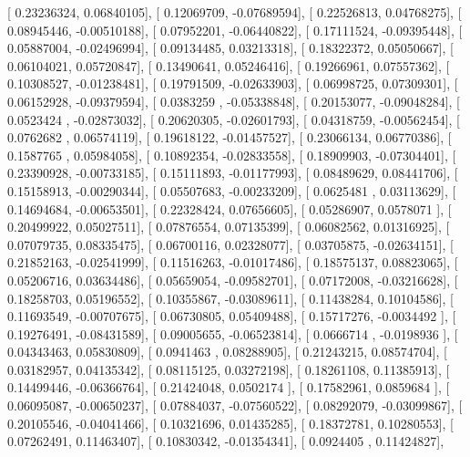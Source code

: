 \documentclass{article}
\begin{document}
       [ 0.23236324,  0.06840105],
       [ 0.12069709, -0.07689594],
       [ 0.22526813,  0.04768275],
       [ 0.08945446, -0.00510188],
       [ 0.07952201, -0.06440822],
       [ 0.17111524, -0.09395448],
       [ 0.05887004, -0.02496994],
       [ 0.09134485,  0.03213318],
       [ 0.18322372,  0.05050667],
       [ 0.06104021,  0.05720847],
       [ 0.13490641,  0.05246416],
       [ 0.19266961,  0.07557362],
       [ 0.10308527, -0.01238481],
       [ 0.19791509, -0.02633903],
       [ 0.06998725,  0.07309301],
       [ 0.06152928, -0.09379594],
       [ 0.0383259 , -0.05338848],
       [ 0.20153077, -0.09048284],
       [ 0.0523424 , -0.02873032],
       [ 0.20620305, -0.02601793],
       [ 0.04318759, -0.00562454],
       [ 0.0762682 ,  0.06574119],
       [ 0.19618122, -0.01457527],
       [ 0.23066134,  0.06770386],
       [ 0.1587765 ,  0.05984058],
       [ 0.10892354, -0.02833558],
       [ 0.18909903, -0.07304401],
       [ 0.23390928, -0.00733185],
       [ 0.15111893, -0.01177993],
       [ 0.08489629,  0.08441706],
       [ 0.15158913, -0.00290344],
       [ 0.05507683, -0.00233209],
       [ 0.0625481 ,  0.03113629],
       [ 0.14694684, -0.00653501],
       [ 0.22328424,  0.07656605],
       [ 0.05286907,  0.0578071 ],
       [ 0.20499922,  0.05027511],
       [ 0.07876554,  0.07135399],
       [ 0.06082562,  0.01316925],
       [ 0.07079735,  0.08335475],
       [ 0.06700116,  0.02328077],
       [ 0.03705875, -0.02634151],
       [ 0.21852163, -0.02541999],
       [ 0.11516263, -0.01017486],
       [ 0.18575137,  0.08823065],
       [ 0.05206716,  0.03634486],
       [ 0.05659054, -0.09582701],
       [ 0.07172008, -0.03216628],
       [ 0.18258703,  0.05196552],
       [ 0.10355867, -0.03089611],
       [ 0.11438284,  0.10104586],
       [ 0.11693549, -0.00707675],
       [ 0.06730805,  0.05409488],
       [ 0.15717276, -0.0034492 ],
       [ 0.19276491, -0.08431589],
       [ 0.09005655, -0.06523814],
       [ 0.0666714 , -0.0198936 ],
       [ 0.04343463,  0.05830809],
       [ 0.0941463 ,  0.08288905],
       [ 0.21243215,  0.08574704],
       [ 0.03182957,  0.04135342],
       [ 0.08115125,  0.03272198],
       [ 0.18261108,  0.11385913],
       [ 0.14499446, -0.06366764],
       [ 0.21424048,  0.0502174 ],
       [ 0.17582961,  0.0859684 ],
       [ 0.06095087, -0.00650237],
       [ 0.07884037, -0.07560522],
       [ 0.08292079, -0.03099867],
       [ 0.20105546, -0.04041466],
       [ 0.10321696,  0.01435285],
       [ 0.18372781,  0.10280553],
       [ 0.07262491,  0.11463407],
       [ 0.10830342, -0.01354341],
       [ 0.0924405 ,  0.11424827],
\end{document}
